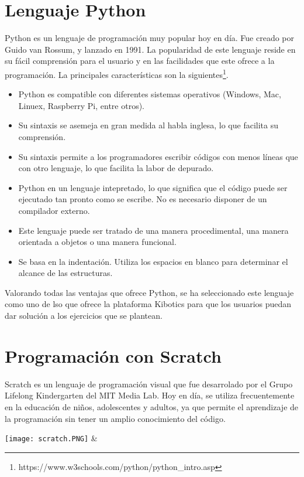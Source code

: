 \section{Lenguaje Python}
Python es un lenguaje de programación muy popular hoy en día. Fue creado por Guido van Rossum, y lanzado en 1991. La popularidad de este lenguaje reside en su fácil comprensión para el usuario y en las facilidades que este ofrece a la programación. La principales características son la siguientes\footnote{https://www.w3schools.com/python/python_intro.asp}.
\begin{itemize}
    \item Python es compatible con diferentes sistemas operativos (Windows, Mac, Linuex, Raspberry Pi, entre otros).
    \item Su sintaxis se asemeja en gran medida al habla inglesa, lo que facilita su comprensión.
    \item Su sintaxis permite a los programadores escribir códigos con menos líneas que con otro lenguaje, lo que facilita la labor de depurado.
    \item Python en un lenguaje intepretado, lo que significa que el código puede ser ejecutado tan pronto como se escribe. No es necesario disponer de un compilador externo.
    \item Este lenguaje puede ser tratado de una manera procedimental, una manera orientada a objetos o una manera funcional.
    \item Se basa en la indentación. Utiliza los espacios en blanco para determinar el alcance de las estructuras.
\end{itemize}

Valorando todas las ventajas que ofrece Python, se ha seleccionado este lenguaje como uno de lso que ofrece la plataforma Kibotics para que los usuarios puedan dar solución a los ejercicios que se plantean.

\section{Programación con Scratch}
Scratch es un lenguaje de programación visual que fue desarrolado por el Grupo Lifelong Kindergarten del MIT Media Lab. Hoy en día, se utiliza frecuentemente en la educación de niños, adolescentes y adultos, ya que permite el aprendizaje de la programación sin tener un amplio conocimiento del código. \newline

\texttt{[image: scratch.PNG]} & \newline

